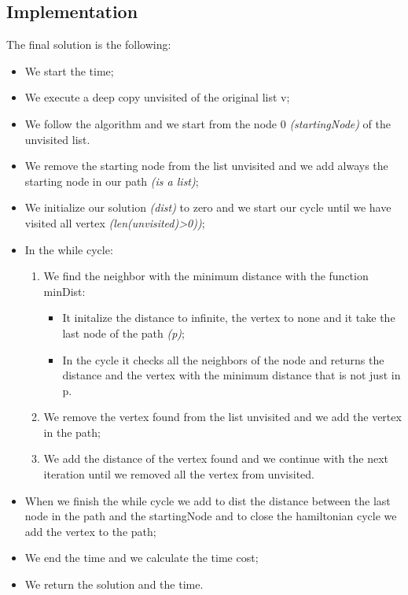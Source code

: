 \subsection{Implementation}
The final solution is the following:
\begin{itemize}
	\item We start the time;
	\item We execute a deep copy unvisited of the original list v;
	\item We follow the algorithm and we start from the node 0 \textit{(startingNode)} of the unvisited list. \item We remove the starting node from the list unvisited and we add always the starting node in our path \textit{(is a list)};
	\item We initialize our solution \textit{(dist)} to zero and we start our cycle until we have visited all vertex \textit{(len(unvisited)>0))};
	\item In the while cycle:
		\begin{enumerate}
			\item  We find the neighbor with the minimum distance with the function minDist:
				\begin{itemize}
				\item  It initalize the distance to infinite, the vertex to none and it take the last node of the path \textit{(p)};
				\item  In the cycle it checks all the neighbors of the node and returns the distance and the vertex with the minimum distance that is not just in p.
				\end{itemize}
			\item We remove the vertex found from the list unvisited and we add the vertex in the path;
			\item We add the distance of the vertex found and we continue with the next iteration until we removed all the vertex from unvisited. 
		\end{enumerate}
	\item When we finish the while cycle we add to dist the distance between the last node in the path and the startingNode and to close the hamiltonian cycle we add the vertex to the path;
	\item We end the time and we calculate the time cost;
	\item We return the solution and the time.
\end{itemize}

\pagebreak